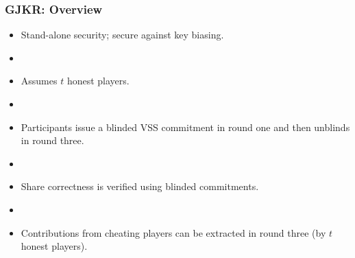 \documentclass[hyperref={pdfpagelabels=true},table,dvipsnames,14pt,aspectratio=169]{beamer}
\begin{document}
\begin{frame}
  \frametitle{GJKR: Overview}

  \begin{itemize}
    \item Stand-alone security; secure against key biasing.
    \item[]
    \item<2-> Assumes $t$ honest players.
    \item[]
    \item<3-> Participants issue a blinded VSS commitment in round one and then unblinds in round three.
    \item[]
    \item<4-> Share correctness is verified using blinded commitments.
    \item[]
    \item<5-> Contributions from cheating players can be extracted in round three (by $t$ honest players).
  \end{itemize}
\end{frame}
\end{document}
